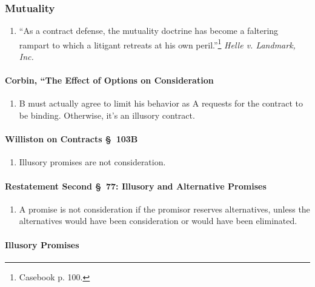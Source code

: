 \subsubsection{Mutuality}

\begin{enumerate}
    \item ``As a contract defense, the mutuality doctrine has become a 
    faltering rampart to which a litigant retreats at his own 
    peril.''\footnote{Casebook p.  100.} \emph{Helle v. Landmark, Inc.}
\end{enumerate}

\paragraph{Corbin, ``The Effect of Options on Consideration}

\begin{enumerate}
    \item B must actually agree to limit his behavior as A requests for the 
    contract to be binding. Otherwise, it's an illusory contract.
\end{enumerate}

\paragraph{Williston on Contracts \S\ 103B}

\begin{enumerate}
    \item Illusory promises are not consideration.
\end{enumerate}

\paragraph{Restatement Second \S\ 77: Illusory and Alternative Promises}

\begin{enumerate}
    \item A promise is not consideration if the promisor reserves 
    alternatives, unless the alternatives would have been consideration or 
    would have been eliminated.
\end{enumerate}

\paragraph{Illusory Promises}

